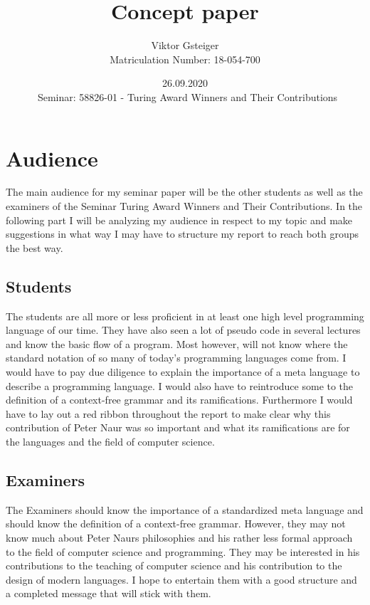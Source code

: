 \documentclass{article}
\author{Viktor Gsteiger \\ Matriculation Number: 18-054-700}
\title{Concept paper}
\date{26.09.2020 \\\ Seminar: 58826-01 - Turing Award Winners and Their Contributions}
\begin{document}
\maketitle

\tableofcontents

\newpage

\section{Audience}

The main audience for my seminar paper will be the other students as well as the examiners of the Seminar Turing Award Winners and Their Contributions. In the following part I will be analyzing my audience in respect to my topic and make suggestions in what way I may have to structure my report to reach both groups the best way.

\subsection{Students}

The students are all more or less proficient in at least one high level programming language of our time. They have also seen a lot of pseudo code in several lectures and know the basic flow of a program. Most however, will not know where the standard notation of so many of today's programming languages come from. I would have to pay due diligence to explain the importance of a meta language to describe a programming language. I would also have to reintroduce some to the definition of a context-free grammar and its ramifications. Furthermore I would have to lay out a red ribbon throughout the report to make clear why this contribution of Peter Naur was so important and what its ramifications are for the languages and the field of computer science. 

\subsection{Examiners}

The Examiners should know the importance of a standardized meta language and should know the definition of a context-free grammar. However, they may not know much about Peter Naurs philosophies and his rather less formal approach to the field of computer science and programming. They may be interested in his contributions to the teaching of computer science and his contribution to the design of modern languages. I hope to entertain them with a good structure and a completed message that will stick with them. 
\end{document}
